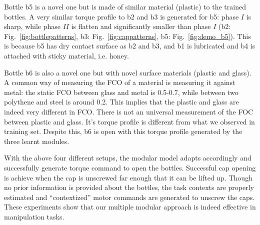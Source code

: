 Bottle b5 is a novel one but is made of similar material (plastic) to the trained bottles. A very similar torque profile to b2 and b3 is generated for b5: phase $I$ is sharp, while phase $II$ is flatten and significantly smaller than phase $I$ (b2: Fig.~\ref{fig:bottlepatterns}, b3: Fig.~\ref{fig:cappatterns}, b5: Fig.~\ref{fig:demo_b5}). This is because b5 has dry contact surface as b2 and b3, and b1 is lubricated and b4 is attached with sticky material, i.e. honey.

Bottle b6 is also a novel one but with novel surface materials (plastic and glass). A common way of measuring the FCO of a material is measuring it against metal: the static FCO between glass and metal is 0.5-0.7, while between two polythene and steel is around 0.2. This implies that the plastic and glass are indeed very different in FCO. There is not an universal measurement of the FOC between plastic and glass. It's torque profile is different from what we observed in training set. Despite this, b6 is open with this torque profile generated by the three learnt modules.

With the above four different setups, the modular model adapts accordingly and successfully generate torque command to open the bottles. Successful cap opening is achieve when the cap is unscrewed far enough that it can be lifted up. Though no prior information is provided about the bottles, the task contexts are properly estimated and ``contextized'' motor commands are generated to unscrew the caps. These experiments show that our multiple modular approach is indeed effective in manipulation tasks.



